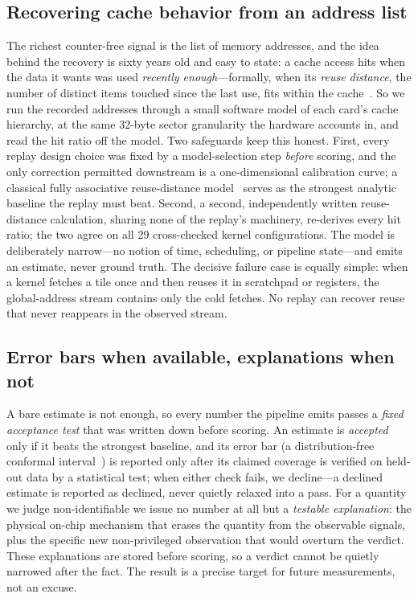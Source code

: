 \documentclass[conference]{IEEEtran}
\begin{document}
\subsection{Recovering cache behavior from an address list}
\label{sec:cachemodel}
The richest counter-free signal is the list of memory addresses, and the idea
behind the recovery is sixty years old and easy to state: a cache access hits
when the data it wants was used \emph{recently enough}---formally, when its
\emph{reuse distance}, the number of distinct items touched since the last
use, fits within the cache~\cite{mattson1970}. So we run the recorded addresses through a small
software model of each card's cache hierarchy, at the same 32-byte sector
granularity the hardware accounts in, and read the hit ratio off the model.
Two safeguards keep this honest. First, every replay design choice was fixed
by a model-selection step \emph{before} scoring, and the only
correction permitted downstream is a one-dimensional calibration curve; a
classical fully associative reuse-distance
model~\cite{nugteren2014gpucache} serves as the strongest analytic baseline
the replay must beat. Second, a second, independently written reuse-distance
calculation, sharing none of the replay's machinery, re-derives every hit
ratio; the two agree on all 29 cross-checked kernel configurations. The
model is deliberately narrow---no notion of time, scheduling, or pipeline
state---and emits an estimate, never ground truth. The decisive failure case
is equally simple: when a kernel fetches a tile once and then reuses it in
scratchpad or registers, the global-address stream contains only the cold
fetches. No replay can recover reuse that never reappears in the observed
stream.

\subsection{Error bars when available, explanations when not}
\label{sec:gates}
A bare estimate is not enough, so every number the pipeline emits passes a
\emph{fixed acceptance test} that was written down before scoring. An estimate is
\emph{accepted} only if it beats the strongest baseline, and its error bar
(a distribution-free conformal interval~\cite{vovk2005alrw}) is reported only
after its claimed coverage is verified on held-out data by a statistical
test; when either check fails, we decline---a declined estimate is reported
as declined, never quietly relaxed into a pass. For a quantity we judge
non-identifiable we issue no number at all but a \emph{testable explanation}: the
physical on-chip mechanism that erases the quantity from the observable
signals, plus the specific new non-privileged observation that would overturn
the verdict. These explanations are stored before scoring, so a verdict cannot
be quietly narrowed after the fact. The result is a precise target for future
measurements, not an excuse.
\end{document}
